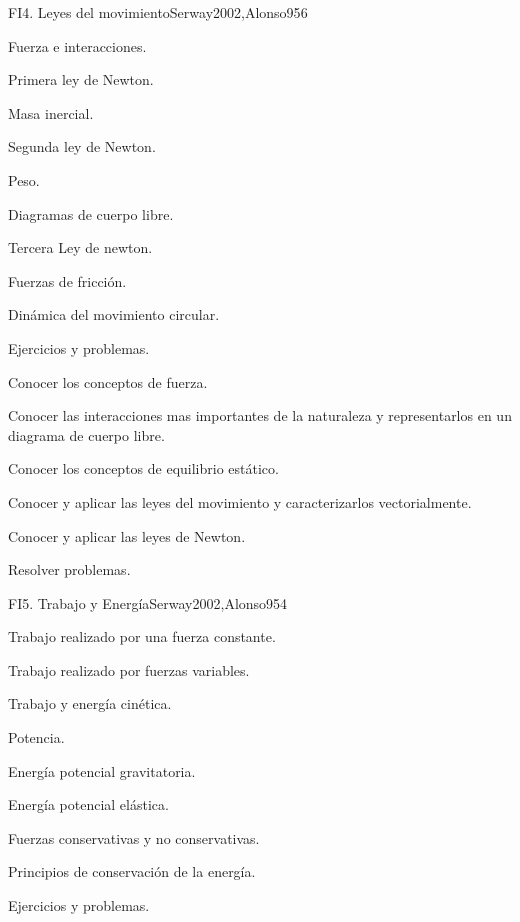\begin{syllabus}
\begin{unit}{FI4. Leyes del movimiento}{Serway2002,Alonso95}{6}
\begin{topics}
      \item Fuerza e interacciones.
      \item Primera ley de Newton.
      \item Masa inercial.
      \item Segunda ley de Newton.
      \item Peso.
      \item Diagramas de cuerpo libre.
      \item Tercera Ley de newton.
      \item Fuerzas de fricción.
      \item Dinámica del movimiento circular.
      \item Ejercicios y problemas.
   \end{topics}

   \begin{learningoutcomes}
      \item Conocer los conceptos de fuerza.
      \item Conocer las interacciones mas importantes de la naturaleza y representarlos en un diagrama de cuerpo libre.
      \item Conocer los conceptos de equilibrio estático.
      \item Conocer y aplicar las leyes del movimiento y caracterizarlos vectorialmente.
      \item Conocer y aplicar las leyes de Newton.
      \item Resolver problemas.
   \end{learningoutcomes}
\end{unit}

\begin{unit}{FI5. Trabajo y Energía}{Serway2002,Alonso95}{4}
\begin{topics}
	\item Trabajo realizado por una fuerza constante.
	\item Trabajo realizado por fuerzas variables.
	\item Trabajo y energía cinética.
	\item Potencia.
	\item Energía potencial gravitatoria.
	\item Energía potencial elástica.
	\item Fuerzas conservativas y no conservativas.
	\item Principios de conservación de la energía.
	\item Ejercicios y problemas.
\end{topics}


\end{unit}
\end{syllabus}
